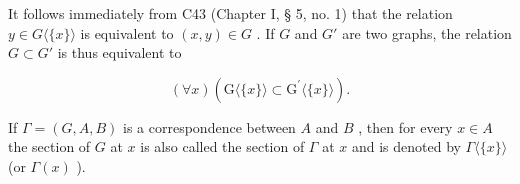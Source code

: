 It follows immediately from C43 (Chapter I, § 5, no. 1) that the relation \(y \in G \langle \{x\} \rangle\) is equivalent to \((x, y) \in G\) . If \(G\) and \(G'\) are two graphs, the relation \(G \subset G'\) is thus equivalent to

\[
(\forall x) (\mathrm{G} \langle \{x \} \rangle \subset \mathrm{G} ^ {\prime} \langle \{x \} \rangle).
\]

If \(\Gamma = (G, A, B)\) is a correspondence between \(A\) and \(B\) , then for every \(x \in A\) the section of \(G\) at \(x\) is also called the section of \(\Gamma\) at \(x\) and is denoted by \(\Gamma \langle \{x\} \rangle\) (or \(\Gamma(x)\) ).

